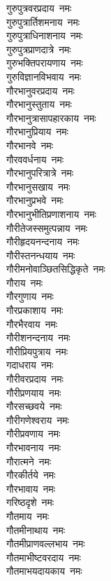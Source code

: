 \begin{multicols}{2}
\begin{flushleft}
गुरुपुत्रवरप्रदाय~नमः\\
गुरुपुत्रार्तिशमनाय~नमः\\
गुरुपुत्राधिनाशनाय~नमः\\
गुरुपुत्रप्राणदात्रे~नमः\\
गुरुभक्तिपरायणाय~नमः\\
गुरुविज्ञानविभवाय~नमः\\
गौरभानुवरप्रदाय~नमः\\
गौरभानुस्तुताय~नमः\\
गौरभानुत्रासापहारकाय~नमः\hfill{}\\
गौरभानुप्रियाय~नमः\\
गौरभानवे~नमः\\
गौरववर्धनाय~नमः\\
गौरभानुपरित्रात्रे~नमः\\
गौरभानुसखाय~नमः\\
गौरभानुप्रभवे~नमः\\
गौरभानुभीतिप्रणाशनाय~नमः\\
गौरीतेजस्समुत्पन्नाय~नमः\\
गौरीहृदयनन्दनाय~नमः\\
गौरीस्तनन्धयाय~नमः\hfill{}\\
गौरीमनोवाञ्छितसिद्धिकृते~नमः\\
गौराय~नमः\\
गौरगुणाय~नमः\\
गौरप्रकाशाय~नमः\\
गौरभैरवाय~नमः\\
गौरीशनन्दनाय~नमः\\
गौरीप्रियपुत्राय~नमः\\
गदाधराय~नमः\\
गौरीवरप्रदाय~नमः\\
गौरीप्रणयाय~नमः\hfill{}\\
गौरसच्छवये~नमः\\
गौरीगणेश्वराय~नमः\\
गौरीप्रवणाय~नमः\\
गौरभावनाय~नमः\\
गौरात्मने~नमः\\
गौरकीर्तये~नमः\\
गौरभावाय~नमः\\
गरिष्ठदृशे~नमः\\
गौतमाय~नमः\\
गौतमीनाथाय~नमः\hfill{}\\
गौतमीप्राणवल्लभाय~नमः\\
गौतमाभीष्टवरदाय~नमः\\
गौतमाभयदायकाय~नमः\\

\end{flushleft}
\end{multicols}
